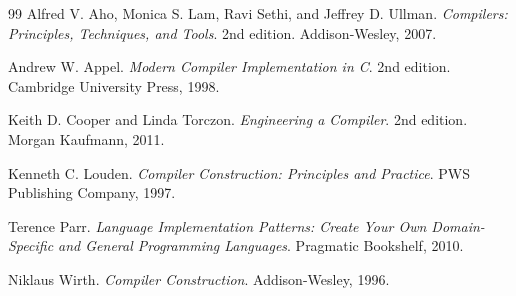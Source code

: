 \begin{thebibliography}{99}
    Alfred V. Aho, Monica S. Lam, Ravi Sethi, and Jeffrey D. Ullman.
    \newblock \emph{Compilers: Principles, Techniques, and Tools}.
    \newblock 2nd edition. Addison-Wesley, 2007.

    Andrew W. Appel.
    \newblock \emph{Modern Compiler Implementation in C}.
    \newblock 2nd edition. Cambridge University Press, 1998.

    Keith D. Cooper and Linda Torczon.
    \newblock \emph{Engineering a Compiler}.
    \newblock 2nd edition. Morgan Kaufmann, 2011.

    Kenneth C. Louden.
    \newblock \emph{Compiler Construction: Principles and Practice}.
    \newblock PWS Publishing Company, 1997.

    Terence Parr.
    \newblock \emph{Language Implementation Patterns: Create Your Own Domain-Specific and General Programming Languages}.
    \newblock Pragmatic Bookshelf, 2010.

    Niklaus Wirth.
    \newblock \emph{Compiler Construction}.
    \newblock Addison-Wesley, 1996.
\end{thebibliography}